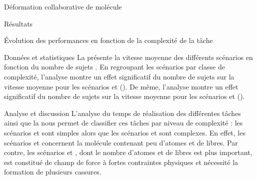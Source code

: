 \documentclass[myfrancais]{mythesis}
\begin{document}
\begin{mychapter}{Déformation collaborative de molécule}
\begin{mysection}{Résultats}
\begin{mysubsection}{Évolution des performances en fonction de la complexité de la tâche}
\begin{mysubsubsection}{Données et statistiques}
					La  présente la vitesse moyenne  des différents scénarios  en fonction du nombre de sujets .
					En regroupant les scénarios par classe de complexité, l'analyse montre un effet significatif du nombre de sujets  sur la vitesse moyenne  pour les scénarios  et  ().
					De même, l'analyse montre un effet significatif du nombre de sujets  sur la vitesse moyenne  pour les scénarios  et  ().
				\end{mysubsubsection}
				\begin{mysubsubsection}{Analyse et discussion}
					L'analyse du temps de réalisation des différentes tâches ainsi que la  nous permet de classifier ces tâches par niveau de complexité : les scénarios  et  sont simples alors que les scénarios  et  sont complexes.
					En effet, les scénarios  et  concernent la molécule \myTRPZIPPER contenant peu d'atomes et de  libres.
					Par contre, les scénarios  et , dont le nombre d'atomes et de  libres est plus important, est constitué de champ de force à fortes contraintes physiques et nécessité la formation de plusieurs cassures.


\end{mysubsubsection}
\end{mysubsection}
\end{mysection}
\end{mychapter}
\end{document}
